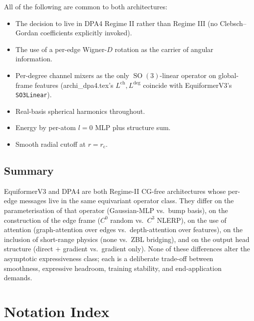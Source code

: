 \documentclass[11pt,a4paper]{article}
\DeclareMathOperator{\SO}{SO}
\newcommand{\rcut}{r_{\mathrm{c}}}
\theoremstyle{plain}
\theoremstyle{definition}
\theoremstyle{remark}
\begin{document}
All of the following are common to both architectures:
\begin{itemize}[leftmargin=2em]
    \item The decision to live in DPA4 Regime II rather than Regime III (no
          Clebsch--Gordan coefficients explicitly invoked).
    \item The use of a per-edge Wigner-$D$ rotation as the carrier of angular
          information.
    \item Per-degree channel mixers as the only $\SO(3)$-linear operator on global-frame
          features (archi\_dpa4.tex's $L^{\mathrm{ch}},L^{\mathrm{deg}}$ coincide with
          EquiformerV3's \texttt{SO3Linear}).
    \item Real-basis spherical harmonics throughout.
    \item Energy by per-atom $l=0$ MLP plus structure sum.
    \item Smooth radial cutoff at $r=\rcut$.
\end{itemize}

\subsection{Summary}\label{sec:compare-summary}

EquiformerV3 and DPA4 are both Regime-II CG-free architectures whose per-edge
messages live in the same equivariant operator class. They differ on the
parameterisation of that operator (Gaussian-MLP vs.\ bump basis), on the
construction of the edge frame ($C^0$ random vs.\ $C^3$ NLERP), on the use of
attention (graph-attention over edges vs.\ depth-attention over features), on
the inclusion of short-range physics (none vs.\ ZBL bridging), and on the
output head structure (direct + gradient vs.\ gradient only). None of these
differences alter the asymptotic expressiveness class; each is a deliberate
trade-off between smoothness, expressive headroom, training stability, and
end-application demands.

\section*{Notation Index}
\end{document}
